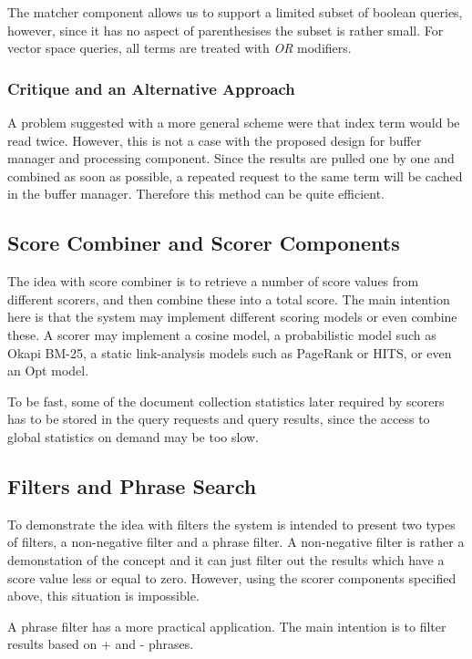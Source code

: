 The matcher component allows us to support a limited subset of boolean queries, however, since it has no aspect of parenthesises the subset is rather small. For vector space queries, all terms are treated with \emph{OR} modifiers.

\subsubsection{Critique and an Alternative Approach}\label{sssub:matcher_critique}

A problem suggested with a more general scheme were that index term would be read twice. However, this is not a case with the proposed design for buffer manager and processing component. Since the results are pulled one by one and combined as soon as possible, a repeated request to the same term will be cached in the buffer manager. Therefore this method can be quite efficient.

\subsection{Score Combiner and Scorer Components}
The idea with score combiner is to retrieve a number of score values from different scorers, and then combine these into a total score. The main intention here is that the system may implement different scoring models or even combine these. A scorer may implement a cosine model, a probabilistic model such as Okapi BM-25, a static link-analysis models such as PageRank or HITS, or even an Opt model.

To be fast, some of the document collection statistics later required by scorers has to be stored in the query requests and query results, since the access to global statistics on demand may be too slow. 

\subsection{Filters and Phrase Search}
To demonstrate the idea with filters the system is intended to present two types of filters, a non-negative filter and a phrase filter. A non-negative filter is rather a demonstation of the concept and it can just filter out the results which have a score value less or equal to zero. However, using the scorer components specified above, this situation is impossible.

A phrase filter has a more practical application. The main intention is to filter results based on + and - phrases.

